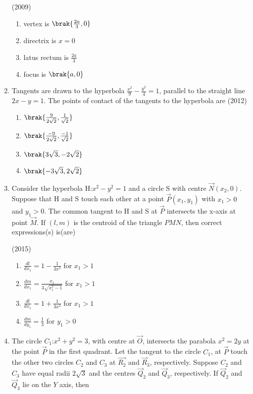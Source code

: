 \begin{enumerate}
		\hfill(2009)
		\begin{multicols}{2}
\begin{enumerate}
			\item vertex is $\brak{\frac{2a}{3},0}$
			\item directrix is $x=0$
				\columnbreak
			\item latus rectum is $\frac{2a}{3}$
			\item focus is $\brak{a,0}$
		\end{enumerate}
\end{multicols}
	\item Tangents are drawn to the hyperbola $\frac{x^2}{9}-\frac{y^2}{4}=1$, parallel to the straight line $2x-y=1$. The points of contact of the tangents to the hyperbola
		are  
		\hfill(2012)
		
		 \begin{multicols}{4}
\begin{enumerate}
			\item $\brak{\frac{9}{2\sqrt{2}},\frac{1}{\sqrt{2}}}$ 
			\item $ \brak{\frac{-9}{2\sqrt{2}},\frac{-1}{\sqrt{2}}}$
			\item $\brak{3\sqrt{3},-2\sqrt{2}}$
			\item $ \brak{-3\sqrt{3},2\sqrt{2}}$
		
		 \end{enumerate}
\end{multicols}
	\item Consider the hyperbola H:$x^2-y^2=1$ and a circle S with 
		centre $\vec{N}(x_2,0)$. Suppose that H and S touch each other at a 
	      point $\vec{P}(x_1,y_1)$ with $x_1>0$ and $y_1>0$. The common tangent to H and S at $\vec{P}$ intersects the x-axis at point $\vec{M}$. If $(l,m)$ is the centroid of the triangle $PMN$, then correct expressions(s) is(are)
	      
	      \hfill(2015)
	      
	       \begin{multicols}{2}
\begin{enumerate}
		      \item $\frac{dl}{dx_1}=1-\frac{1}{3x^2}$ for $x_1>1$ 
		      \item $\frac{dm}{dx_1}=\frac{x_1}{3\sqrt{x_1^2-1}}$ for $x_1>1$ 
		      \item $\frac{dl}{dx_1}=1+\frac{1}{3x^2}$ for $x_1>1$
		      \item $\frac{dm}{dy_1}=\frac{1}{3}$ for $y_1>0$ 
	       \end{enumerate}
\end{multicols}
      \item The circle $C_1$:$x^2+y^2=3$, with centre at $\vec{O}$, intersects the parabola $x^2=2y$ at the point $\vec{P}$ in the first quadrant. Let the tangent to the circle $C_1$, at $\vec{P}$ touch the other two circles $C_2$ and $C_3$ at $\vec{R_2}$ and $\vec{R}_3$, respectively. Suppose $C_2$ and $C_3$ have equal radii $2\sqrt{3}$ and the centres $\vec{Q}_2$ and $\vec{Q}_3$, respectively. If $\vec{Q}_2$ and $\vec{Q}_3$ lie on the $Y$ axis, then 


\end{enumerate}
